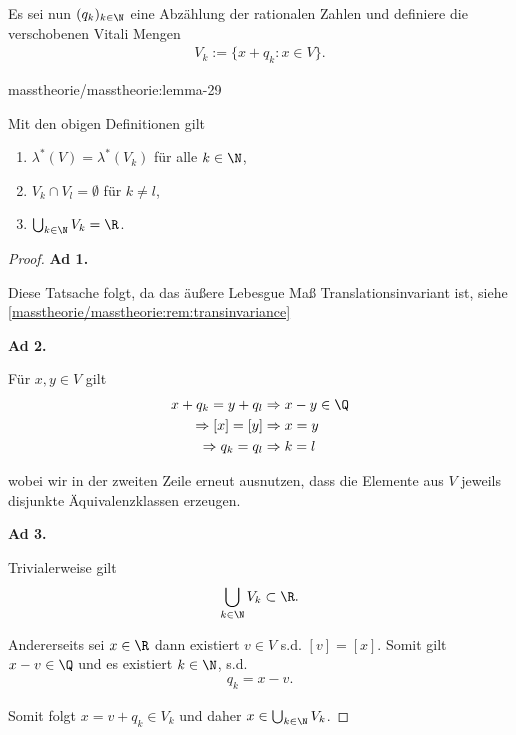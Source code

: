 \documentclass[letterpaper,10pt,english]{jupyterBook}
\begin{document}
\par
Es sei nun \((q_k)_{k\in\N}\) eine Abzählung der rationalen Zahlen und definiere die verschobenen Vitali Mengen
\begin{align*}
V_k :=\{x+q_k: x\in V\}.
\end{align*}\begin{lemma}{}{masstheorie/masstheorie:lemma-29}



\par
Mit den obigen Definitionen gilt
\begin{enumerate}

\item {} 
\par
\(\lambda^\ast(V) = \lambda^\ast(V_k)\) für alle \(k\in\N\),

\item {} 
\par
\(V_k\cap V_l=\emptyset\) für \(k\neq l\),

\item {} 
\par
\(\bigcup_{k\in\N} V_k = \R\).

\end{enumerate}
\end{lemma}

\begin{proof}
 

\par
\textbf{Ad 1.}

\par
Diese Tatsache folgt, da das äußere Lebesgue Maß Translationsinvariant ist, siehe \cref{masstheorie/masstheorie:rem:transinvariance} 

\par
\textbf{Ad 2.}

\par
Für \(x,y\in V\) gilt
\begin{align*}
x + q_k = y + q_l&\Rightarrow x-y\in\Q\\
\Rightarrow [x]=[y]&\Rightarrow x=y\\
\Rightarrow q_k=q_l&\Rightarrow k=l
\end{align*}
\par
wobei wir in der zweiten Zeile erneut ausnutzen, dass die Elemente aus \(V\) jeweils disjunkte Äquivalenzklassen erzeugen.

\par
\textbf{Ad 3.}

\par
Trivialerweise gilt
\begin{align*}
\bigcup_{k\in\N} V_k \subset \R.
\end{align*}
\par
Andererseits sei \(x\in\R\) dann existiert \(v\in V\) s.d. \([v] = [x]\). Somit gilt \(x-v\in\Q\) und es existiert \(k\in\N\), s.d.
\begin{align*}
q_k = x-v.
\end{align*}
\par
Somit folgt \(x=v+q_k\in V_k\) und daher \(x\in\bigcup_{k\in\N} V_k\).
\end{proof}
\end{document}
